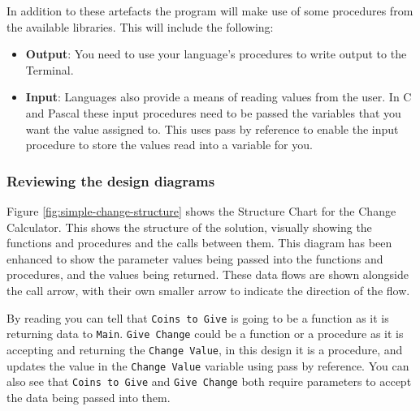 In addition to these artefacts the program will make use of some procedures from the available libraries. This will include the following:
\begin{itemize}
  \item \textbf{Output}: You need to use your language's procedures to write output to the Terminal.
  \item \textbf{Input}: Languages also provide a means of reading values from the user. In C and Pascal these input procedures need to be passed the variables that you want the value assigned to. This uses pass by reference to enable the input procedure to store the values read into a variable for you.
\end{itemize}




\subsubsection{Reviewing the design diagrams} %
\label{ssub:reviewing_the_design_diagrams}

Figure \ref{fig:simple-change-structure} shows the Structure Chart for the Change Calculator. This shows the structure of the solution, visually showing the functions and procedures and the calls between them. This diagram has been enhanced to show the parameter values being passed into the functions and procedures, and the values being returned. These data flows are shown alongside the call arrow, with their own smaller arrow to indicate the direction of the flow. 

By reading  you can tell that \texttt{Coins to Give} is going to be a function as it is returning data to \texttt{Main}. \texttt{Give Change} could be a function or a procedure as it is accepting and returning the \texttt{Change Value}, in this design it is a procedure, and updates the value in the \texttt{Change Value} variable using pass by reference. You can also see that \texttt{Coins to Give} and \texttt{Give Change} both require parameters to accept the data being passed into them. 

